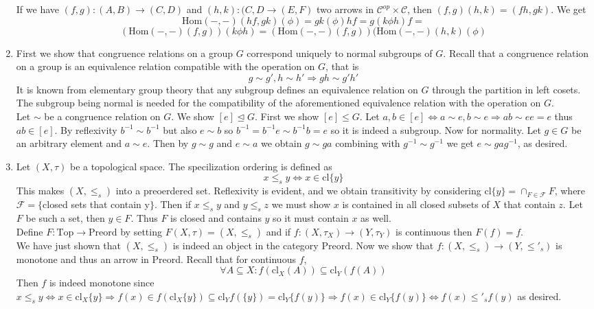 \documentclass[11pt]{article}
\theoremstyle{plain}
\theoremstyle{definition}
\theoremstyle{remark}
\newcommand{\cC}{\mathcal{C}}
\newcommand{\Hom}{\mathrm{Hom}}
\begin{document}
\begin{exercises}
\begin{enumerate}
 If we have $(f,g):(A,B) \to (C,D)$ and $(h,k):(C,D \to (E,F)$ two arrows in $\cC^{op} \times \cC$, then $(f,g)(h,k)=(fh,gk)$. We get \[\Hom(-,-)(hf,gk)(\phi)=gk (\phi) hf=g(k \phi h)f=\] \[(\Hom(-,-)(f,g))(k \phi h)= (\Hom(-,-)(f,g))(\Hom(-,-)(h,k)(\phi)\]

\item First we show that congruence relations on a group $G$ correspond uniquely to normal subgroups of $G$. Recall that a congruence relation on a group is an equivalence relation compatible with the operation on $G$, that is \[g \sim g' , h\sim h' \Rightarrow gh \sim g'h'\]
It is known from elementary group theory that any subgroup defines an equivalence relation on $G$ through the partition in left cosets. The subgroup being normal is needed for the compatibility of the aforementioned equivalence relation with the operation on $G$.\\
Let $ \sim$ be a congruence relation on $G$. We show $[e] \trianglelefteq G$. First we show $[e]\leq G$. Let $a,b \in [e] \iff a \sim e , b \sim e \Rightarrow ab \sim ee=e$ thus $ab \in [e]$. By reflexivity $b^{-1} \sim b^{-1}$ but also $e \sim b$ so $b^{-1}=b^{-1}e \sim b^{-1} b=e$ so it is indeed a subgroup. Now for normality. Let $g \in G$ be an arbitrary element and $a \sim e$. Then by $g\sim g$ and $e \sim a$ we obtain $g \sim ga$ combining with $g^{-1}\sim g^{-1}$ we get $e \sim gag^{-1}$, as desired.
\item Let $(X,\tau)$ be a topological space. The specilization ordering is defined as \[ x \leq_s y \iff x \in  \text{cl}\{y\} \]
This makes $(X, \leq_s)$ into a preoerdered set. Reflexivity is evident, and we obtain transitivity by considering $\text{cl}\{y\}=\cap_{F\in \mathcal{F}} F$, where $\mathcal{F}=\{$closed sets that contain y$\}$. Then if $x \leq_s y$ and $y \leq_s z$ we must show $x$ is contained in all closed subsets of $X$ that contain $z$. Let $F$ be such a set, then $y \in F$. Thus $F$ is closed and contains $y$ so it must contain $x$ as well.\\
 Define $F: \text{Top} \to \text{Preord}$ by setting $F(X,\tau)=(X, \leq_s)$ and if $f:(X,\tau_X) \to (Y,\tau_Y)$ is continuous then $F(f)=f$.\\
 We have just shown that $(X,\leq_s)$ is indeed an object in the category $\text{Preord}$. Now we show that $f:(X, \leq_s)\to (Y, \leq'_s)$ is monotone and thus an arrow in Preord. Recall that for continuous $f$, \[ \forall A \subseteq X: f(\text{cl}_X(A)) \subseteq \text{cl}_Y(f(A)) \]
 Then $f$ is indeed monotone since $x \leq_s y \iff x \in \text{cl}_X\{y\} \Rightarrow f(x) \in f(\text{cl}_X\{y\}) \subseteq \text{cl}_Yf(\{y\})=\text{cl}_Y \{f(y)\} \Rightarrow f(x) \in \text{cl}_Y \{f(y)\}  \iff f(x) \leq'_s f(y)$ as desired.\\

\end{enumerate}
\end{exercises}
\end{document}
